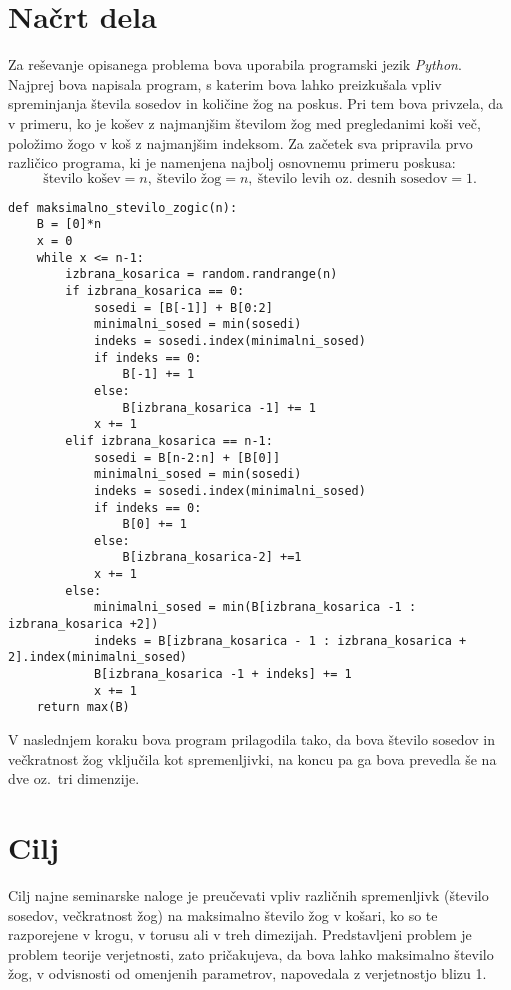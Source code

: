 \documentclass[a4paper, 11pt]{article}
\begin{document}
\section{Načrt dela}
Za reševanje opisanega problema bova uporabila programski jezik \emph{Python}. Najprej bova napisala program, s katerim bova
lahko preizkušala vpliv spreminjanja števila sosedov in količine žog na poskus. Pri tem bova privzela, da v primeru, ko je  
košev z najmanjšim številom žog med pregledanimi koši več, položimo žogo v koš z najmanjšim indeksom. Za začetek sva
pripravila prvo različico programa, ki je namenjena najbolj osnovnemu primeru poskusa:
$$ \text{število košev} = n,\  \text{število žog} = n, \ \text{število levih oz.\ desnih sosedov} = 1 .$$

\begin{verbatim}
def maksimalno_stevilo_zogic(n):
    B = [0]*n
    x = 0
    while x <= n-1:
        izbrana_kosarica = random.randrange(n)
        if izbrana_kosarica == 0:
            sosedi = [B[-1]] + B[0:2]
            minimalni_sosed = min(sosedi)
            indeks = sosedi.index(minimalni_sosed)
            if indeks == 0:
                B[-1] += 1
            else:
                B[izbrana_kosarica -1] += 1
            x += 1
        elif izbrana_kosarica == n-1:
            sosedi = B[n-2:n] + [B[0]]
            minimalni_sosed = min(sosedi)
            indeks = sosedi.index(minimalni_sosed)
            if indeks == 0:
                B[0] += 1
            else:
                B[izbrana_kosarica-2] +=1
            x += 1
        else:
            minimalni_sosed = min(B[izbrana_kosarica -1 : izbrana_kosarica +2])
            indeks = B[izbrana_kosarica - 1 : izbrana_kosarica + 2].index(minimalni_sosed)
            B[izbrana_kosarica -1 + indeks] += 1
            x += 1
    return max(B)
\end{verbatim}

\noindent V naslednjem koraku bova program prilagodila tako, da bova število sosedov in večkratnost žog vključila kot spremenljivki,
na koncu pa ga bova prevedla še na dve oz.\ tri dimenzije.

\section{Cilj}
Cilj najne seminarske naloge je preučevati vpliv različnih spremenljivk (število sosedov, večkratnost žog) na maksimalno število žog
v košari, ko so te razporejene v krogu, v torusu ali v treh dimezijah. Predstavljeni problem je problem teorije verjetnosti, zato pričakujeva,
da bova lahko maksimalno število žog, v odvisnosti od omenjenih parametrov, napovedala z verjetnostjo blizu 1.
\end{document}
